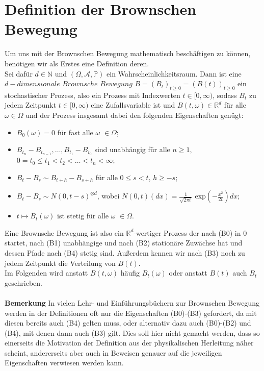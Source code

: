 \documentclass[12pt,a4paper]{scrartcl}
\numberwithin{equation}{section}
\newcommand{\R}{\mathbb{R}} %
\newcommand{\N}{\mathbb{N}} %
\numberwithin{equation}{section}%
\theoremstyle{definition}
\begin{document}
\section{Definition der Brownschen Bewegung}
Um uns mit der Brownschen Bewegung mathematisch beschäftigen zu können, benötigen wir als Erstes eine Definition deren.\\
Sei dafür $d \in \N $ und $\left(\Omega, \mathcal{A}, \mathbb{P}\right)$ ein Wahrscheinlichkeitsraum. Dann ist eine $d-dimensionale$ $Brownsche$ $Bewegung$ $B = (B_t)_{t \geq 0} = (B(t))_{t \geq 0}$  ein stochastischer Prozess, also ein Prozess mit Indexwerten $t \in [0,\infty)$, sodass $B_t$ zu jedem Zeitpunkt $t \in [0,\infty)$ eine Zufallsvariable ist und $B(t,\omega) \in \R^d$ für alle $\omega \in \Omega$ und der Prozess insgesamt dabei den folgenden Eigenschaften genügt:
\begin{itemize}[leftmargin=2cm]
\item[(B0)] $B_0(\omega) = 0$ für fast alle $\omega$ $\in \Omega$;
\item[(B1)] $B_{t_n}-B_{t_{n-1}}, \dots ,B_{t_1}-B_{t_0}$ sind unabhängig für alle $n\geq 1$,\\
$0 = t_0\leq t_1 <t_2 < \dots <t_n<\infty$;
\item[(B2)] $B_t-B_s \sim B_{t+h}-B_{s+h}$ für alle $0\leq s < t$, $h\geq -s$;
\item[(B3)]  $B_t-B_s \sim N(0,t-s)^{\otimes d}$, wobei $N(0,t)(dx) = \tfrac{1}{\sqrt{2\pi t}}$ exp$(-\tfrac{x^2}{2t})dx$;
\item[(B4)] $t \mapsto B_t(\omega)$ ist stetig für alle $\omega$ $\in \Omega$.
\end{itemize}

\noindent Eine Brownsche Bewegung ist also ein $\R ^d$-wertiger Prozess der nach (B0) in 0 startet, nach (B1) unabhängige und nach (B2) stationäre Zuwächse hat und dessen Pfade nach (B4) stetig sind. Außerdem kennen wir nach (B3) noch zu jedem Zeitpunkt die Verteilung von $B(t)$.\\

\noindent Im Folgenden wird anstatt $B(t,\omega)$ häufig $B_t(\omega)$ oder anstatt $B(t)$ auch $B_t$ geschrieben.\\
\\
\noindent \textbf{Bemerkung} In vielen Lehr- und Einführungsbüchern zur Brownschen Bewegung werden in der Definitionen oft nur die Eigenschaften (B0)-(B3) gefordert, da mit diesen bereits auch (B4) gelten muss, oder alternativ dazu auch (B0)-(B2) und (B4), mit denen dann auch (B3) gilt.
Dies soll hier nicht gemacht werden, dass so einerseits die Motivation der Definition aus der physikalischen Herleitung näher scheint, andererseits aber auch in Beweisen genauer auf die jeweiligen Eigenschaften verwiesen werden kann.
\end{document}
